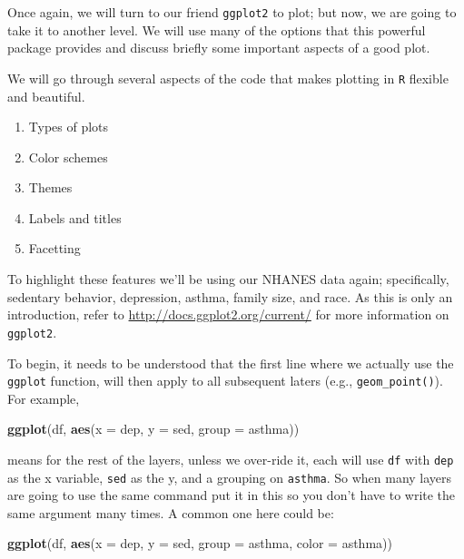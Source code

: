 \documentclass[]{tufte-book}
\newenvironment{Shaded}{}{}
\newcommand{\KeywordTok}[1]{\textcolor[rgb]{0.00,0.44,0.13}{\textbf{#1}}}
\newcommand{\DataTypeTok}[1]{\textcolor[rgb]{0.56,0.13,0.00}{#1}}
\newcommand{\NormalTok}[1]{#1}
\providecommand{\tightlist}{%
  \setlength{\itemsep}{0pt}\setlength{\parskip}{0pt}}
\theoremstyle{definition}
\theoremstyle{definition}
\theoremstyle{remark}
\begin{document}
Once again, we will turn to our friend \texttt{ggplot2} to plot; but
now, we are going to take it to another level. We will use many of the
options that this powerful package provides and discuss briefly some
important aspects of a good plot.

We will go through several aspects of the code that makes plotting in
\texttt{R} flexible and beautiful.

\begin{enumerate}
\def\labelenumi{\arabic{enumi}.}
\tightlist
\item
  Types of plots
\item
  Color schemes
\item
  Themes
\item
  Labels and titles
\item
  Facetting
\end{enumerate}

To highlight these features we'll be using our NHANES data again;
specifically, sedentary behavior, depression, asthma, family size, and
race. As this is only an introduction, refer to
\url{http://docs.ggplot2.org/current/} for more information on
\texttt{ggplot2}.

To begin, it needs to be understood that the first line where we
actually use the \texttt{ggplot} function, will then apply to all
subsequent laters (e.g., \texttt{geom\_point()}). For example,

\begin{Shaded}
\begin{Highlighting}[]
\KeywordTok{ggplot}\NormalTok{(df, }\KeywordTok{aes}\NormalTok{(}\DataTypeTok{x =}\NormalTok{ dep, }\DataTypeTok{y =}\NormalTok{ sed, }\DataTypeTok{group =}\NormalTok{ asthma))}
\end{Highlighting}
\end{Shaded}

means for the rest of the layers, unless we over-ride it, each will use
\texttt{df} with \texttt{dep} as the x variable, \texttt{sed} as the y,
and a grouping on \texttt{asthma}. So when many layers are going to use
the same command put it in this so you don't have to write the same
argument many times. A common one here could be:

\begin{Shaded}
\begin{Highlighting}[]
\KeywordTok{ggplot}\NormalTok{(df, }\KeywordTok{aes}\NormalTok{(}\DataTypeTok{x =}\NormalTok{ dep, }\DataTypeTok{y =}\NormalTok{ sed, }\DataTypeTok{group =}\NormalTok{ asthma, }
    \DataTypeTok{color =}\NormalTok{ asthma))}
\end{Highlighting}
\end{Shaded}
\end{document}
